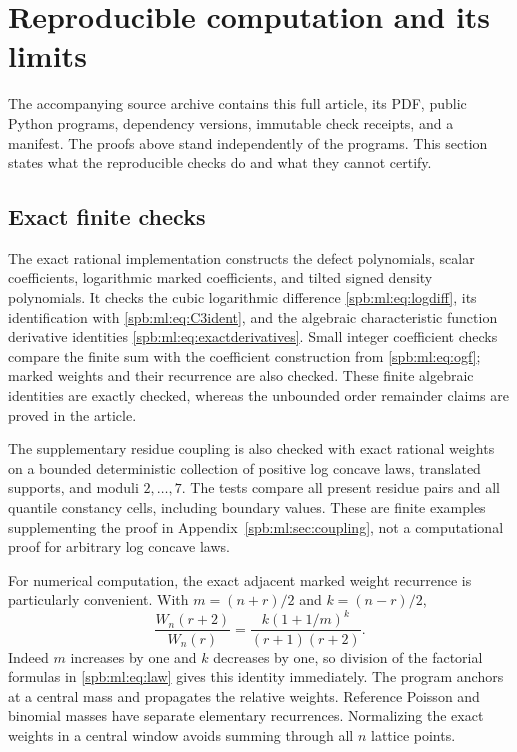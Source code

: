\section{Reproducible computation and its limits}\label{spb:ml:sec:computation}
The accompanying source archive contains this full article, its PDF, public Python programs, dependency versions, immutable check receipts, and a manifest. The proofs above stand independently of the programs. This section states what the reproducible checks do and what they cannot certify.

\subsection{Exact finite checks}
The exact rational implementation constructs the defect polynomials, scalar coefficients, logarithmic marked coefficients, and tilted signed density polynomials. It checks the cubic logarithmic difference \eqref{spb:ml:eq:logdiff}, its identification with \eqref{spb:ml:eq:C3ident}, and the algebraic characteristic function derivative identities \eqref{spb:ml:eq:exactderivatives}. Small integer coefficient checks compare the finite sum with the coefficient construction from \eqref{spb:ml:eq:ogf}; marked weights and their recurrence are also checked. These finite algebraic identities are exactly checked, whereas the unbounded order remainder claims are proved in the article.

The supplementary residue coupling is also checked with exact rational weights on a bounded deterministic collection of positive log concave laws, translated supports, and moduli $2,\ldots,7$. The tests compare all present residue pairs and all quantile constancy cells, including boundary values. These are finite examples supplementing the proof in Appendix~\ref{spb:ml:sec:coupling}, not a computational proof for arbitrary log concave laws.

For numerical computation, the exact adjacent marked weight recurrence is particularly convenient. With $m=(n+r)/2$ and $k=(n-r)/2$,
\begin{equation}\label{spb:ml:eq:weightrecurrence}
 \frac{W_n(r+2)}{W_n(r)}
 =\frac{k(1+1/m)^k}{(r+1)(r+2)}.
\end{equation}
Indeed $m$ increases by one and $k$ decreases by one, so division of the factorial formulas in \eqref{spb:ml:eq:law} gives this identity immediately. The program anchors at a central mass and propagates the relative weights. Reference Poisson and binomial masses have separate elementary recurrences. Normalizing the exact weights in a central window avoids summing through all $n$ lattice points.


